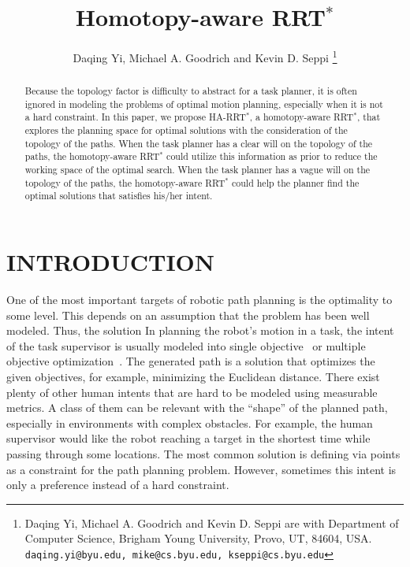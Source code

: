 \documentclass[letterpaper, 10 pt, conference]{ieeeconf}
\title{\LARGE \bf
Homotopy-aware RRT$^{*}$
}
\author{
Daqing Yi, Michael A. Goodrich and Kevin D. Seppi
\thanks{Daqing Yi, Michael A. Goodrich and Kevin D. Seppi are with Department of Computer Science, Brigham Young University, Provo, UT, 84604, USA.
{\tt\small daqing.yi@byu.edu, mike@cs.byu.edu, kseppi@cs.byu.edu} }
}
\begin{document}
\maketitle
\thispagestyle{empty}
\pagestyle{empty}


\begin{abstract}
Because the topology factor is difficulty to abstract for a task planner, it is often ignored in modeling the problems of optimal motion planning, especially when it is not a hard constraint.
In this paper, we propose HA-RRT$^{*}$, a homotopy-aware RRT$^{*}$, that explores the planning space for optimal solutions with the consideration of the topology of the paths.
When the task planner has a clear will on the topology of the paths, the homotopy-aware RRT$^{*}$ could utilize this information as prior to reduce the working space of the optimal search.
When the task planner has a vague will on the topology of the paths, the homotopy-aware RRT$^{*}$ could help the planner find the optimal solutions that satisfies his/her intent.


\end{abstract}


\section{INTRODUCTION}
\label{sec:intro}

One of the most important targets of robotic path planning is the optimality to some level.
This depends on an assumption that the problem has been well modeled.
Thus, the solution 
In planning the robot's motion in a task, the intent of the task supervisor is usually modeled into single objective~\cite{6974170} or multiple objective optimization~\cite{yi2014supporting}.
The generated path is a solution that optimizes the given objectives, for example, minimizing the Euclidean distance.
There exist plenty of other human intents that are hard to be modeled using measurable metrics.
A class of them can be relevant with the ``shape'' of the planned path, especially in environments with complex obstacles.
For example, the human supervisor would like the robot reaching a target in the shortest time while passing through some locations.
The most common solution is defining via points as a constraint for the path planning problem.
However, sometimes this intent is only a preference instead of a hard constraint.
\end{document}
